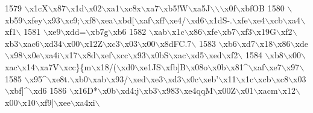 \begin{DoxyCode}
1579 \textcolor{stringliteral}{\(\backslash\)x1cX\(\backslash\)x87\(\backslash\)x1d\(\backslash\)x02\(\backslash\)xa1\(\backslash\)xc8x\(\backslash\)xa7\(\backslash\)xb5!W\(\backslash\)xa5J\(\backslash\)\(\backslash\)\(\backslash\)x0f\(\backslash\)xbfOB%
1580 \textcolor{stringliteral}{\(\backslash\)xb59\(\backslash\)xfey\(\backslash\)x93\(\backslash\)xc9;\(\backslash\)xf8\(\backslash\)xea\(\backslash\)xbd[\(\backslash\)xaf\(\backslash\)xff\(\backslash\)xe4/\(\backslash\)xd6\(\backslash\)x1dS-.\(\backslash\)xfe\(\backslash\)xe4\(\backslash\)xcb\(\backslash\)xa4\(\backslash\)xf1\(\backslash\)}
1581 \textcolor{stringliteral}{\(\backslash\)xe9\(\backslash\)xdd=\(\backslash\)xb7g\(\backslash\)xb6%
1582 \textcolor{stringliteral}{\(\backslash\)xab\(\backslash\)x1c\(\backslash\)x86\(\backslash\)xfe\(\backslash\)xb7\(\backslash\)xf3\(\backslash\)x19G\(\backslash\)xf2\(\backslash\)xb3\(\backslash\)xac6\(\backslash\)xd34\(\backslash\)x00\(\backslash\)x12Z\(\backslash\)xc3\(\backslash\)x03\(\backslash\)x00\(\backslash\)x8dFC.7\(\backslash\)}
1583 \textcolor{stringliteral}{\(\backslash\)xb6\(\backslash\)xd7\(\backslash\)x18\(\backslash\)x86\(\backslash\)xde\(\backslash\)x98\(\backslash\)x0e\(\backslash\)xa4i\(\backslash\)x17\(\backslash\)x8d\(\backslash\)xef\(\backslash\)xcc\(\backslash\)x93\(\backslash\)x0bS\(\backslash\)xac\(\backslash\)xd5\(\backslash\)xed\(\backslash\)xf2\(\backslash\)}
1584 \textcolor{stringliteral}{\(\backslash\)xb8\(\backslash\)x00\(\backslash\)xac\(\backslash\)x14\(\backslash\)xa7V\(\backslash\)xcc\}\{m\(\backslash\)x18/(\(\backslash\)xd0\(\backslash\)xe1JS\(\backslash\)xfb]B\(\backslash\)x08o\(\backslash\)x0b\(\backslash\)x81^\(\backslash\)xaf\(\backslash\)xe7\(\backslash\)x97\(\backslash\)}
1585 \textcolor{stringliteral}{\(\backslash\)x95^\(\backslash\)xe8t.\(\backslash\)xb0\(\backslash\)xab\(\backslash\)x93/\(\backslash\)xed\(\backslash\)xe3\(\backslash\)xd3\(\backslash\)x0c\(\backslash\)xeb'\(\backslash\)x11\(\backslash\)x1c\(\backslash\)xcb\(\backslash\)xc8\(\backslash\)x03\(\backslash\)xbf]^\(\backslash\)xd6%
1586 \textcolor{stringliteral}{\(\backslash\)x16D*\(\backslash\)x0b\(\backslash\)xd4:j\(\backslash\)xb3\(\backslash\)x983\(\backslash\)xe4qqM\(\backslash\)x00Z\(\backslash\)x01\(\backslash\)xacm\(\backslash\)x12\(\backslash\)x00\(\backslash\)x10\(\backslash\)xf9|\(\backslash\)xee\(\backslash\)xa4xi\(\backslash\)}
}}}
\end{DoxyCode}
